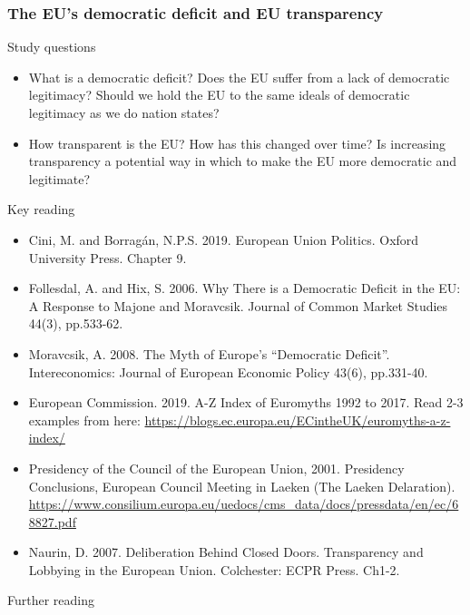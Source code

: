 \subsubsection*{The EU’s democratic deficit and EU transparency}

Study questions

\begin{itemize}
	\item What is a democratic deficit? Does the EU suffer from a lack of democratic legitimacy? Should we hold the EU to the same ideals of democratic legitimacy as we do nation states?
	\item How transparent is the EU? How has this changed over time? Is increasing transparency a potential way in which to make the EU more democratic and legitimate?
\end{itemize}

\noindent Key reading

\begin{itemize}
	\item Cini, M. and Borragán, N.P.S. 2019. European Union Politics. Oxford University Press. Chapter 9.
	\item Follesdal, A. and Hix, S. 2006. Why There is a Democratic Deficit in the EU: A Response to Majone and Moravcsik. Journal of Common Market Studies 44(3), pp.533-62.
	\item Moravcsik, A. 2008. The Myth of Europe’s “Democratic Deficit”. Intereconomics: Journal of European Economic Policy 43(6), pp.331-40.
	\item European Commission. 2019. A-Z Index of Euromyths 1992 to 2017. Read 2-3 examples from here: \url{https://blogs.ec.europa.eu/ECintheUK/euromyths-a-z-index/}
	\item Presidency of the Council of the European Union, 2001. Presidency Conclusions, European Council Meeting in Laeken (The Laeken Delaration). \url{https://www.consilium.europa.eu/uedocs/cms_data/docs/pressdata/en/ec/68827.pdf}
	\item Naurin, D. 2007. Deliberation Behind Closed Doors. Transparency and Lobbying in the European Union. Colchester: ECPR Press. Ch1-2.
\end{itemize}

\noindent Further reading

